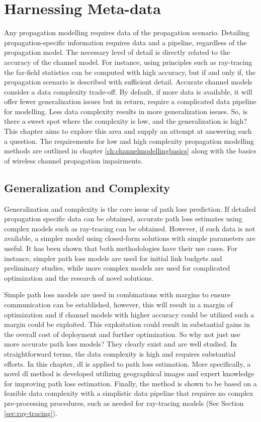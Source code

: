 \chapter{Harnessing Meta-data}\label{ch:satelliteImages}

Any propagation modelling requires data of the propagation scenario. Detailing propagation-specific information requires data and a pipeline, regardless of the propagation model. The necessary level of detail is directly related to the accuracy of the channel model. For instance, using principles such as ray-tracing the far-field statistics can be computed with high accuracy, but if and only if, the propagation scenario is described with sufficient detail. Accurate channel models consider a data complexity trade-off. By default, if more data is available, it will offer fewer generalization issues but in return, require a complicated data pipeline for modelling. Less data complexity results in more generalization issues. So, is there a sweet spot where the complexity is low, and the generalization is high? This chapter aims to explore this area and supply an attempt at answering such a question. The requirements for low and high complexity propagation modelling methods are outlined in chapter \ref{ch:channelmodellingbasics} along with the basics of wireless channel propagation impairments. 


\section{Generalization and Complexity \label{sec:generalization}}



Generalization and complexity is the core issue of path loss prediction. If detailed propagation specific data can be obtained, accurate path loss estimates using complex models such as ray-tracing can be obtained. However, if such data is not available, a simpler model using closed-form solutions with simple parameters are useful. It has been shown that both methodologies have their use cases. For instance, simpler path loss models are used for initial link budgets and preliminary studies, while more complex models are used for complicated optimization and the research of novel solutions.


Simple path loss models are used in combinations with margins to ensure communication can be established, however, this will result in a margin of optimization and if channel models with higher accuracy could be utilized such a margin could be exploited. This exploitation could result in substantial gains in the overall cost of deployment and further optimization. So why not just use more accurate path loss models? They clearly exist and are well studied. In straightforward terms, the data complexity is high and requires substantial efforts. In this chapter, \gls{dl} is applied to path loss estimation. More specifically, a novel \gls{dl} method is developed utilizing geographical images and expert knowledge for improving path loss estimation. Finally, the method is shown to be based on a feasible data complexity with a simplistic data pipeline that requires no complex pre-processing procedures, such as needed for ray-tracing models (See Section \ref{sec:ray-tracing}).

